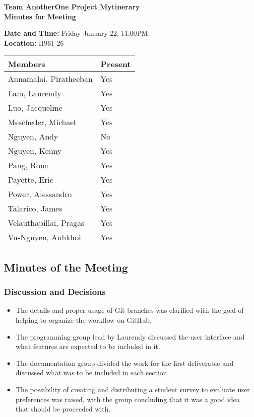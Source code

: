 \documentclass[paper=a4, fontsize=11pt]{scrartcl}
\begin{document}
\thispagestyle{empty}

\begin{center}
\textbf{Team AnotherOne \qquad Project Mytinerary \\ Minutes for Meeting}
\vspace{0.33cm}
\end{center}

\textbf{Date and Time: } Friday January 22, 11:00PM \\
\textbf{Location: } H961-26 \\

\begin{center}
\begin{tabular}{| m{4cm} | m{4cm} |} \hline
\textbf{Members} & \textbf{Present} \\ \hline
Annamalai, Piratheeban & Yes \\ \hline
Lam, Laurendy          & Yes \\ \hline
Luo, Jacqueline        & Yes \\ \hline
Mescheder, Michael     & Yes \\ \hline
Nguyen, Andy           & No  \\ \hline
Nguyen, Kenny          & Yes \\ \hline
Pang, Ronn             & Yes \\ \hline
Payette, Eric          & Yes \\ \hline
Power, Alessandro      & Yes \\ \hline
Talarico, James        & Yes \\ \hline
Velauthapillai, Pragas & Yes \\ \hline
Vu-Nguyen, Anhkhoi     & Yes \\ \hline
\end{tabular}
\end{center}

\subsection*{Minutes of the Meeting}
\subsubsection*{Discussion and Decisions}
\begin{itemize}
    \item The details and proper usage of Git branches was clarified with the goal of
    helping to organize the workflow on GitHub.
    \item The programming group lead by Laurendy discussed the user interface and what features are expected to be included in it.
    \item The documentation group divided the work for the first deliverable and discussed
    what was to be included in each section.
    \item The possibility of creating and distributing a student survey to evaluate
    user preferences was raised, with the group concluding that it was a good idea that
    should be proceeded with.
\end{itemize}
\end{document}

